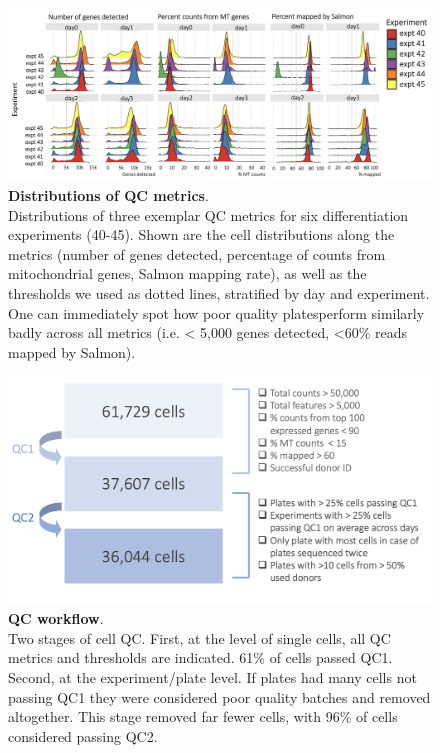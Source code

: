 \begin{figure}[h]
\centering
\includegraphics[width=16cm]{Chapter4/Fig/endodiff_qc_examples.png}
\caption[Distributions of QC metrics]{\textbf{Distributions of QC metrics}.\\
Distributions of three exemplar QC metrics for six differentiation experiments (40-45).
Shown are the cell distributions along the metrics (number of genes detected, percentage of counts from mitochondrial genes, Salmon \cite{patro2017salmon} mapping rate), as well as the thresholds we used as dotted lines, stratified by day and experiment.
One can immediately spot how poor quality plates\footnotemark  perform similarly badly across all metrics (i.e. < 5,000 genes detected, <60\% reads mapped by Salmon).}
\label{fig:endodiff_qc_distributions}
\end{figure}

\begin{figure}[h]
\centering
\includegraphics[width=16cm]{Chapter4/Fig/endodiff_qc_workflow.png}
\caption[QC workflow]{\textbf{QC workflow}.\\
Two stages of cell QC.
First, at the level of single cells, all QC metrics and thresholds are indicated.
61\% of cells passed QC1.
Second, at the experiment/plate level.
If plates had many cells not passing QC1 they were considered poor quality batches and removed altogether.
This stage removed far fewer cells, with 96\% of cells considered passing QC2.}
\label{fig:endodiff_qc_workflow}
\end{figure}

